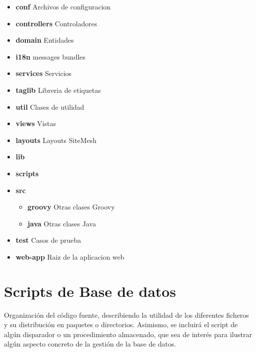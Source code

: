 \begin{itemize}
	\item \textbf{conf} Archivos de configuracion
	\item \textbf{controllers} Controladores
	\item \textbf{domain} Entidades
	\item \textbf{i18n} messages bundles
	\item \textbf{services} Servicios
	\item \textbf{taglib} Libreria de etiquetas
	\item \textbf{util} Clases de utilidad
	\item \textbf{views} Vistas
	\item \textbf{layouts} Layouts SiteMesh
	\item \textbf{lib}
	\item \textbf{scripts}
	\item \textbf{src}
	
	\begin{itemize}
		\item \textbf{groovy} Otras clases Groovy
		\item \textbf{java} Otras clases Java
	\end{itemize}
	
	\item \textbf{test} Casos de prueba
	\item \textbf{web-app} Raiz de la aplicacion web
\end{itemize}

\section{Scripts de Base de datos}
Organización del código fuente, describiendo la utilidad de los diferentes ficheros y su distribución en paquetes o directorios. Asimismo, se incluirá el script de algún disparador o un procedimiento almacenado, que sea de interés para ilustrar algún aspecto concreto de la gestión de la base de datos.

